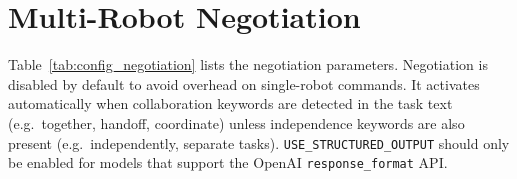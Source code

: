 \documentclass[
     12pt,
     a4paper,
     BCOR=10mm,
     DIV=14,
     listof=totoc,
     bibliography=totoc,
     parskip,
     twoside,
     headsepline
     ]{scrreprt}
\begin{document}
\begin{table}[ht]
	\centering
	\caption{AutoRT configuration parameters.}
	\label{tab:config_autort}
\end{table}

\section{Multi-Robot Negotiation}\label{appendix:config:negotiation}
Table~\ref{tab:config_negotiation} lists the negotiation parameters. Negotiation is disabled by default to avoid overhead on single-robot commands. It activates automatically when collaboration keywords are detected in the task text (e.g.\ together, handoff, coordinate) unless independence keywords are also present (e.g.\ independently, separate tasks). \texttt{USE\_STRUCTURED\_OUTPUT} should only be enabled for models that support the OpenAI \texttt{response\_format} API.
\end{document}
